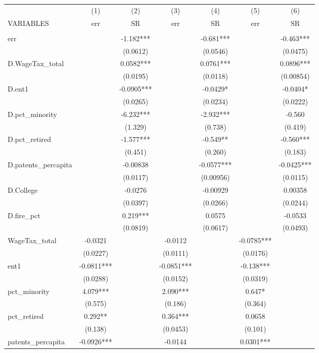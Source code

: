 \begin{tabular}{lcccccc} \hline
 & (1) & (2) & (3) & (4) & (5) & (6) \\
VARIABLES & err & SR & err & SR & err & SR \\ \hline
 &  &  &  &  &  &  \\
err &  & -1.182*** &  & -0.681*** &  & -0.463*** \\
 &  & (0.0612) &  & (0.0546) &  & (0.0475) \\
D.WageTax\_total &  & 0.0582*** &  & 0.0761*** &  & 0.0896*** \\
 &  & (0.0195) &  & (0.0118) &  & (0.00854) \\
D.ent1 &  & -0.0905*** &  & -0.0429* &  & -0.0404* \\
 &  & (0.0265) &  & (0.0234) &  & (0.0222) \\
D.pct\_minority &  & -6.232*** &  & -2.932*** &  & -0.560 \\
 &  & (1.329) &  & (0.738) &  & (0.419) \\
D.pct\_retired &  & -1.577*** &  & -0.549** &  & -0.560*** \\
 &  & (0.451) &  & (0.260) &  & (0.183) \\
D.patents\_percapita &  & -0.00838 &  & -0.0577*** &  & -0.0425*** \\
 &  & (0.0117) &  & (0.00956) &  & (0.0115) \\
D.College &  & -0.0276 &  & -0.00929 &  & 0.00358 \\
 &  & (0.0397) &  & (0.0266) &  & (0.0244) \\
D.fire\_pct &  & 0.219*** &  & 0.0575 &  & -0.0533 \\
 &  & (0.0819) &  & (0.0617) &  & (0.0493) \\
WageTax\_total & -0.0321 &  & -0.0112 &  & -0.0785*** &  \\
 & (0.0227) &  & (0.0111) &  & (0.0176) &  \\
ent1 & -0.0811*** &  & -0.0851*** &  & -0.138*** &  \\
 & (0.0288) &  & (0.0152) &  & (0.0319) &  \\
pct\_minority & 4.079*** &  & 2.090*** &  & 0.647* &  \\
 & (0.575) &  & (0.186) &  & (0.364) &  \\
pct\_retired & 0.292** &  & 0.364*** &  & 0.0658 &  \\
 & (0.138) &  & (0.0453) &  & (0.101) &  \\
patents\_percapita & -0.0926*** &  & -0.0144 &  & 0.0301*** &  \\

\end{tabular}

